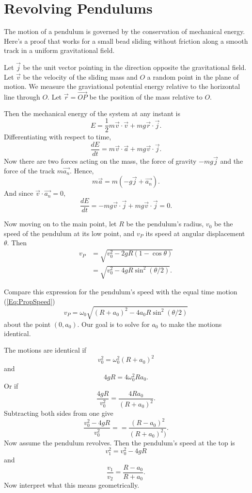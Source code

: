 \documentclass{ximera}
\begin{document}
\section*{Revolving Pendulums}
The motion of a pendulum is governed by the conservation of mechanical energy. Here's a proof that works for a small bead sliding without friction along a smooth track in a uniform gravitational field.

Let $\overrightarrow{j}$ be the unit vector pointing in the direction opposite the gravitational field. Let $\overrightarrow{v}$ be the velocity of the sliding mass and $O$ a random point in the plane of motion. We measure the graviational potential energy relative to the horizontal line through $O$. Let $\overrightarrow{r} = \overrightarrow{OP}$ be the position of the mass relative to $O$.

Then the mechanical energy of the system at any instant is
\[
        E = \frac{1}{2}m \overrightarrow{v} \cdot \overrightarrow{v} + mg \overrightarrow{r}\cdot \overrightarrow{j} .
\] 
Differentiating with respect to time,
\[
     \frac{dE}{dt} = m\overrightarrow{v} \cdot \overrightarrow{a}  + m g \overrightarrow{v} \cdot \overrightarrow{j} .
\]
Now there are two forces acting on the mass, the force of gravity $-mg\overrightarrow{j}$  and the force of the track $m \overrightarrow{a_n}$. Hence, 
\[
   m\overrightarrow{a} = m \left(    -g\overrightarrow{j} + \overrightarrow{a_n}   \right) . 
\]
And since $\overrightarrow{v}\cdot \overrightarrow{a_n}=0$,
\[
    \frac{dE}{dt} = -mg \overrightarrow{v}\cdot \overrightarrow{j} + mg \overrightarrow{v} \cdot \overrightarrow{j} = 0.
\]


Now moving on to the main point, let $R$ be the pendulum's radius, $v_0$ be the speed of the pendulum at its low point, and $v_P$ its speed at angular displacement $\theta$. Then
\begin{align*}
    v_P    &= \sqrt{v_0^2 - 2gR(1-\cos\theta)}  \\
          &= \sqrt{v_0^2 - 4gR\sin^2 (\theta/2)} .
\end{align*}

Compare this expression for the pendulum's speed with the equal time motion (\ref{Eq:PropSpeed}) 
\[
    v_P  = \omega_0 \sqrt{(R+a_0)^2 - 4a_0R\sin^2(\theta/2)}
\]
about the point $(0,a_0)$. Our goal is to solve for $a_0$ to make the motions identical.

The motions are identical if
\[
     v_0^2 = \omega_0^2 (R+a_0)^2  
\]
and
\[
      4gR = 4\omega_0^2 Ra_0 .
\]
Or if
\[
    \frac{4gR}{v_0^2}    = \frac{4Ra_0}{(R+a_0)^2}      .
\]
Subtracting both sides from one give
\[
         \frac{v_0^2 - 4gR}{v_0^2} =  = \frac{(R - a_0)^2}{(R+a_0)^2)}  .
\]
Now assume the pendulum revolves. Then the pendulum's speed at the top is
\[
      v_1^2 = v_0^2 - 4gR 
\]
and
\[
    \frac{v_1}{v_2} = \frac{R-a_0}{R+a_0} .
\]
Now interpret what this means geometrically.
\end{document}
